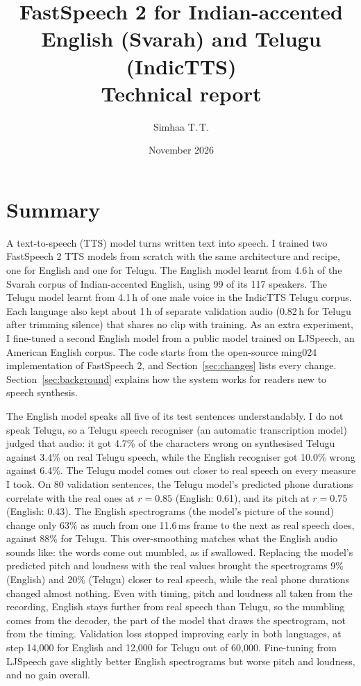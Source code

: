 \documentclass[11pt,a4paper]{article}
\title{FastSpeech 2 for Indian-accented English (Svarah) and Telugu (IndicTTS)\\[3pt]\large Technical report}
\author{Simhaa T.\,T.}
\date{November 2026}
\begin{document}
\maketitle

\section{Summary}
A text-to-speech (TTS) model turns written text into speech. I trained two FastSpeech 2 TTS models from scratch
with the same architecture and recipe, one for English and one for Telugu. The English model learnt from 4.6\,h
of the Svarah corpus of Indian-accented English, using 99 of its 117 speakers. The Telugu model learnt from 4.1\,h
of one male voice in the IndicTTS Telugu corpus. Each language also kept about 1\,h of separate validation audio
(0.82\,h for Telugu after trimming silence) that shares no clip with training. As an extra experiment, I
fine-tuned a second English model from a public model trained on LJSpeech, an American English corpus. The code
starts from the open-source ming024 implementation of FastSpeech 2, and Section~\ref{sec:changes} lists every
change. Section~\ref{sec:background} explains how the system works for readers new to speech synthesis.

The English model speaks all five of its test sentences understandably. I do not speak Telugu, so a Telugu speech
recogniser (an automatic transcription model) judged that audio: it got 4.7\% of the characters wrong on
synthesised Telugu against 3.4\% on real Telugu speech, while the English recogniser got 10.0\% wrong against
6.4\%. The Telugu model comes out closer to real speech on every measure I took. On 80 validation sentences, the
Telugu model's predicted phone durations correlate with the real ones at $r = 0.85$ (English: 0.61), and its pitch
at $r = 0.75$ (English: 0.43). The English spectrograms (the model's picture of the sound) change only 63\% as
much from one 11.6\,ms frame to the next as real speech does, against 88\% for Telugu. This over-smoothing matches
what the English audio sounds like: the words come out mumbled, as if swallowed. Replacing the model's predicted
pitch and loudness with the real values brought the spectrograms 9\% (English) and 20\% (Telugu) closer to real
speech, while the real phone durations changed almost nothing. Even with timing, pitch and loudness all taken
from the recording, English stays further from real speech than Telugu, so the mumbling comes from the decoder,
the part of the model that draws the spectrogram, not from the timing. Validation loss stopped improving early in
both languages, at step 14,000 for English and 12,000 for Telugu out of 60,000. Fine-tuning from LJSpeech gave
slightly better English spectrograms but worse pitch and loudness, and no gain overall.
\end{document}
